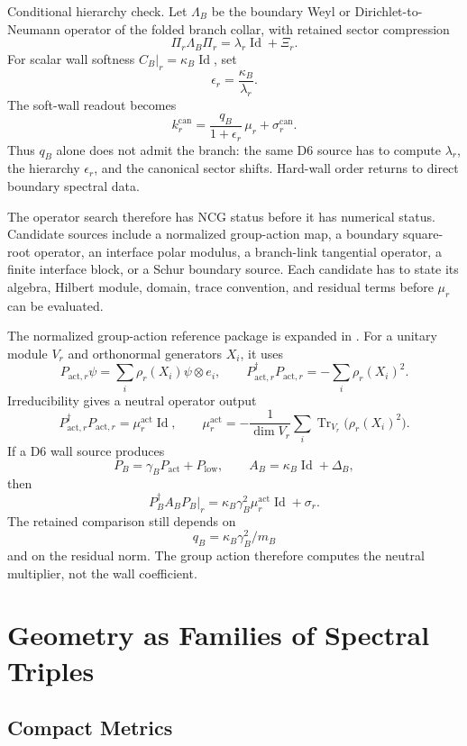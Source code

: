\documentclass[11pt]{article}
\newcommand{\Tr}{\operatorname{Tr}}
\newcommand{\Id}{\operatorname{Id}}
\begin{document}
Conditional hierarchy check.  Let \(\Lambda_B\) be the boundary Weyl or
Dirichlet-to-Neumann operator of the folded branch collar, with retained
sector compression
\[
  \Pi_r\Lambda_B\Pi_r=\lambda_r\Id+\Xi_r .
\]
For scalar wall softness \(C_B\vert_r=\kappa_B\Id\), set
\[
  \epsilon_r=\frac{\kappa_B}{\lambda_r}.
\]
The soft-wall readout becomes
\[
  k_r^{\mathrm{can}}
    =\frac{q_B}{1+\epsilon_r}\,\mu_r+\sigma_r^{\mathrm{can}} .
\]
Thus \(q_B\) alone does not admit the branch: the same D6 source has to
compute \(\lambda_r\), the hierarchy \(\epsilon_r\), and the canonical
sector shifts.  Hard-wall order returns to direct boundary spectral data.

The operator search therefore has NCG status before it has numerical status.
Candidate sources include a normalized group-action map, a boundary
square-root operator, an interface polar modulus, a branch-link tangential
operator, a finite interface block, or a Schur boundary source.  Each
candidate has to state its algebra, Hilbert module, domain, trace convention,
and residual terms before \(\mu_r\) can be evaluated.

The normalized group-action reference package is expanded in
\cite{ncg-equivariant-multiplier}.  For a unitary module \(V_r\) and
orthonormal generators \(X_i\), it uses
\[
  P_{\mathrm{act},r}\psi
    =\sum_i\rho_r(X_i)\psi\otimes e_i,
  \qquad
  P_{\mathrm{act},r}^{\dagger}P_{\mathrm{act},r}
    =-\sum_i\rho_r(X_i)^2 .
\]
Irreducibility gives a neutral operator output
\[
  P_{\mathrm{act},r}^{\dagger}P_{\mathrm{act},r}
     =\mu_r^{\mathrm{act}}\Id,\qquad
  \mu_r^{\mathrm{act}}
     =-\frac{1}{\dim V_r}\sum_i
       \Tr_{V_r}\!\big(\rho_r(X_i)^2\big).
\]
If a D6 wall source produces
\[
  P_B=\gamma_B P_{\mathrm{act}}+P_{\mathrm{low}},
  \qquad A_B=\kappa_B\Id+\Delta_B,
\]
then
\[
  P_B^\dagger A_BP_B\vert_r
    =\kappa_B\gamma_B^2\mu_r^{\mathrm{act}}\Id+\sigma_r .
\]
The retained comparison still depends on
\[
  q_B=\kappa_B\gamma_B^2/m_B
\]
and on the residual norm.  The group action therefore computes the neutral
multiplier, not the wall coefficient.

\section{Geometry as Families of Spectral Triples}

\subsection{Compact Metrics}
\end{document}
